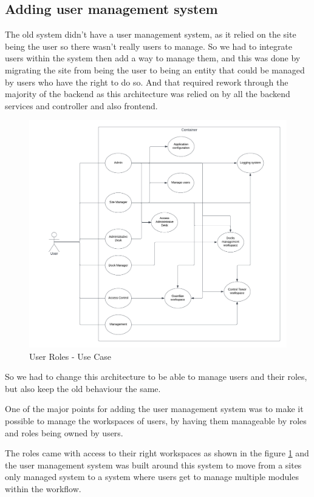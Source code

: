 \subsection{Adding user management system}\label{subsec:user_management}

The old system didn't have a user management system, as it relied on the site being the
user so there wasn't really users to manage. So we had to integrate users within the system
then add a way to manage them, and this was done by migrating the site from being the user
to being an entity that could be managed by users who have the right to do so.
And that required rework through the majority of the backend as this architecture was
relied on by all the backend services and controller and also frontend.

\begin{figure}[!ht]
    \centering
    \includegraphics[width=\textwidth]{images/useCaseRoles.png}
    \caption{User Roles - Use Case}
    \label{fig:useCaseRoles}
\end{figure}

So we had to change this architecture to be able to manage users and their roles, but also
keep the old behaviour the same.

One of the major points for adding the user management system was to make it
possible to manage the workspaces of users, by having them manageable by roles
and roles being owned by users.

The roles came with access to their right workspaces as shown in the figure
\ref{fig:useCaseRoles} and the user management system was built around this system to
move from a sites only managed system to a system where users get to manage multiple
modules within the workflow.

